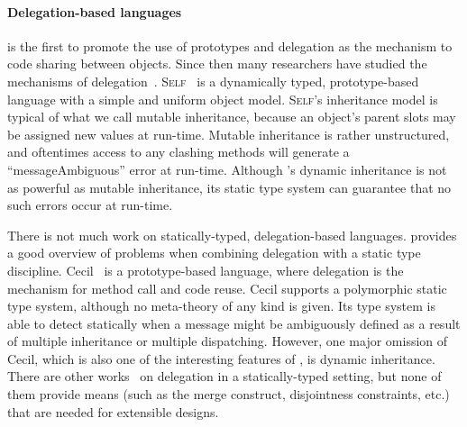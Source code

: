 



\paragraph{Delegation-based languages}

\citet{lieberman1986using} is the first to promote the use of prototypes and
delegation as the mechanism to code sharing between objects. Since then many
researchers have studied the mechanisms of
delegation~\cite{wegner1987dimensions,malenfant1995semantic,goldberg1989smalltalk}.
\textsc{Self}~\cite{ungar1988self} is a dynamically typed, prototype-based
language with a simple and uniform object model. \textsc{Self}'s inheritance
model is typical of what we call mutable inheritance, because an object's parent
slots may be assigned new values at run-time. Mutable inheritance is rather
unstructured, and oftentimes access to any clashing methods will generate a
``messageAmbiguous'' error at run-time. Although \name's dynamic inheritance is
not as powerful as mutable inheritance, its static type system can guarantee
that no such errors occur at run-time.

There is not much work on statically-typed, delegation-based languages.
\citet{kniesel1999type} provides a good overview of problems when combining
delegation with a static type discipline. Cecil~\cite{chambers1992object,
  chambers1993cecil} is a prototype-based language, where delegation is the
mechanism for method call and code reuse. Cecil supports a polymorphic static
type system, although no meta-theory of any kind is given. Its type system is
able to detect statically when a message might be ambiguously defined as a
result of multiple inheritance or multiple dispatching. However, one major
omission of Cecil, which is also one of the interesting features of \name, is
dynamic inheritance. There are other
works~\cite{fisher1995delegation,anderson2003can} on delegation in a
statically-typed setting, but none of them provide means (such as the merge
construct, disjointness constraints, etc.) that are needed for extensible
designs.

